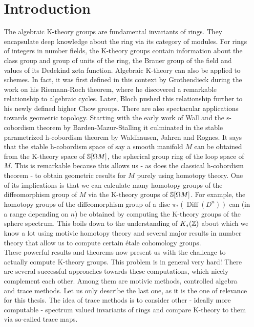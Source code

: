 \chapter{Introduction}

The algebraic K-theory groups are fundamental invariants of rings. 
They encapsulate deep knowledge about the ring via its category of modules.
For rings of integers in number fields, the K-theory groups contain information about the class group and group of units of the ring, the Brauer group of the field and values of its Dedekind zeta function.
Algebraic K-theory can also be applied to schemes. In fact, it was first defined in this context by Grothendieck during the work on his Riemann-Roch theorem, where he discovered a remarkable relationship to algebraic cycles.
Later, Bloch pushed this relationship further to his newly defined higher Chow groups.
There are also spectacular applications towards geometric topology.
Starting with the early work of Wall and the s-cobordism theorem by Barden-Mazur-Stalling it culminated in the stable parametrized h-cobordism theorem by Waldhausen, Jahren and Rognes. It says that the stable h-cobordism space of say a smooth manifold $M$ can be obtained from the K-theory space of $\S[\Omega M]$, the spherical group ring of the loop space of $M$.
This is remarkable because this allows us - as does the classical h-cobordism theorem - to obtain geometric results for $M$ purely using homotopy theory.
One of its implications is that we can calculate many homotopy groups of the diffeomorphism group of $M$ via the K-theory groups of $\S[\Omega M]$.
For example, the homotopy groups of the diffeomorphism group of a disc $\pi_* (\operatorname{Diff}(D^n))$ can (in a range depending on $n$) be obtained by computing the K-theory groups of the sphere spectrum. This boils down to the understanding of $K_*(\Z)$ about which we know a lot using motivic homotopy theory and several major results in number theory that allow us to compute certain étale cohomology groups.
\\
These powerful results and theorems now present us with the challenge to actually compute K-theory groups. 
This problem is in general very hard! 
There are several successful approaches towards these computations, which nicely complement each other. Among them are motivic methods, controlled algebra and trace methods. 
Let us only describe the last one, as it is the one of relevance for this thesis.
The idea of trace methods is to consider other - ideally more computable - spectrum valued invariants of rings and compare K-theory to them via so-called trace maps. 
